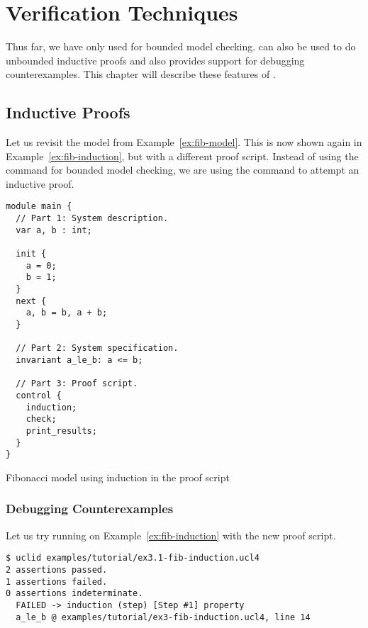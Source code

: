 \chapter{Verification Techniques}

Thus far, we have only used \uclid{} for bounded model checking. \uclid{} can also be used to do unbounded inductive proofs and also provides support for debugging counterexamples. This chapter will describe these features of \uclid{}.

\section{Inductive Proofs}
Let us revisit the model from Example~\ref{ex:fib-model}. This is now shown again in Example~\ref{ex:fib-induction}, but with a different proof script. Instead of using the  command for bounded model checking, we are using the  command to attempt an inductive proof.

\begin{uclidlisting}[htbp]
\begin{lstlisting}[language=uclid,style=uclidstyle]
module main {
  // Part 1: System description.
  var a, b : int;

  init {
    a = 0;
    b = 1;
  }
  next {
    a, b = b, a + b;
  }

  // Part 2: System specification.
  invariant a_le_b: a <= b;

  // Part 3: Proof script.
  control {
    induction;
    check;
    print_results;
  }
}
\end{lstlisting}
\label{ex:fib-induction}
\caption{\uclid{} Fibonacci model using induction in the proof script}
\end{uclidlisting}

\subsection{Debugging Counterexamples}

Let us try running \uclid{} on Example~\ref{ex:fib-induction} with the new proof script.
\begin{Verbatim}[frame=single, samepage=true]
$ uclid examples/tutorial/ex3.1-fib-induction.ucl4 
2 assertions passed.
1 assertions failed.
0 assertions indeterminate.
  FAILED -> induction (step) [Step #1] property 
  a_le_b @ examples/tutorial/ex3-fib-induction.ucl4, line 14
\end{Verbatim}

